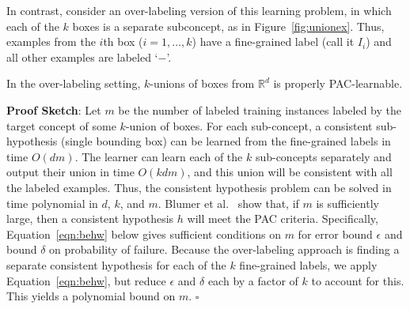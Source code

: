 In contrast, consider an over-labeling version of this learning problem,
in which each of the $k$ boxes
is a separate subconcept, as in Figure~\ref{fig:unionex}. 
Thus, examples from the $i$th box ($i=1,\ldots , k$) have a
fine-grained label (call it $I_i$) and all other 
examples are labeled `$-$'.
\begin{obs}
In the over-labeling setting, $k$-unions of boxes from $\mathbb{R}^d$
is properly PAC-learnable.
\end{obs}
{\bf Proof Sketch}: Let $m$ be the number of labeled training instances labeled
by the target concept of some $k$-union of boxes.
For each sub-concept, a consistent sub-hypothesis
(single bounding box)
can be learned from the fine-grained labels in time $O(dm)$.
The learner can learn each of the $k$ sub-concepts separately and
output their union in time $O(kdm)$, and this  union
will be consistent with all the labeled examples.
Thus, the consistent hypothesis problem can be solved in time polynomial in
$d$, $k$, and $m$.
Blumer et al.~\cite{behw-lvd-89} show that, if $m$ is sufficiently large,
then a consistent hypothesis $h$ will meet the PAC criteria.
Specifically, Equation~\ref{eqn:behw} below gives sufficient conditions on
$m$ for error bound $\epsilon$ and bound $\delta$ on probability of failure.
Because the over-labeling approach is finding a separate consistent hypothesis
for each of the $k$ fine-grained labels,
we apply Equation~\ref{eqn:behw}, but reduce
$\epsilon$ and $\delta$ each by a factor of $k$ to account for this.
This yields a polynomial bound on $m$.
 \hfill $\square$

